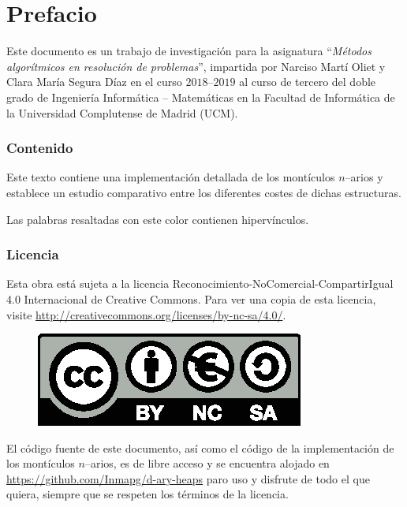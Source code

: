 \chapter*{Prefacio}
Este documento es un trabajo de investigación para la asignatura ``\textit{Métodos algorítmicos en resolución de problemas}'', impartida por Narciso Martí Oliet y Clara María Segura Díaz en el curso $2018$--$2019$ al curso de tercero del doble grado de Ingeniería Informática -- Matemáticas en la Facultad de Informática de la Universidad Complutense de Madrid (UCM).

\subsection*{Contenido}
Este texto contiene una implementación detallada de los montículos $n$--arios y establece un estudio comparativo entre los diferentes costes de dichas estructuras.
\newline

Las palabras resaltadas con \textcolor{hyperlinkColour}{este color} contienen hipervínculos.

\subsection*{Licencia}
Esta obra está sujeta a la licencia Reconocimiento-NoComercial-CompartirIgual 4.0 Internacional de Creative Commons. Para ver una copia de esta licencia, visite \url{http://creativecommons.org/licenses/by-nc-sa/4.0/}.
\begin{figure}[h]
	\centering
	\includegraphics[scale=1]{img/licencia}
\end{figure}

El código fuente de este documento, así como el código de la implementación de los montículos $n$--arios, es de libre acceso y se encuentra alojado en \url{https://github.com/Inmapg/d-ary-heaps} paro uso y disfrute de todo el que quiera, siempre que se respeten los términos de la licencia.
